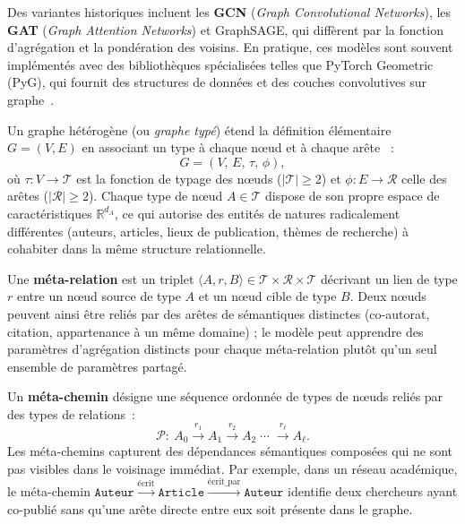 Des variantes historiques incluent les \textbf{GCN} (\emph{Graph Convolutional Networks}), les \textbf{GAT} (\emph{Graph Attention Networks}) et GraphSAGE, qui diff\`erent par la fonction d'agr\'egation et la pond\'eration des voisins.
En pratique, ces mod\`eles sont souvent impl\'ement\'es avec des biblioth\`eques sp\'ecialis\'ees telles que PyTorch Geometric (PyG), qui fournit des structures de donn\'ees et des couches convolutives sur graphe~\cite{fey2019pyg}.


\label{sec:graphes-heterogenes}

Un graphe h\'et\'erog\`ene (ou \emph{graphe typ\'e}) \'etend la d\'efinition \'el\'ementaire $G=(V,E)$ en associant un type \`a chaque n\oe ud et \`a chaque ar\^ete~\cite{hu2020hgt} :
\[
G = (V,\, E,\, \tau,\, \phi),
\]
o\`u $\tau : V \to \mathcal{T}$ est la fonction de typage des n\oe uds ($|\mathcal{T}| \geq 2$) et $\phi : E \to \mathcal{R}$ celle des ar\^etes ($|\mathcal{R}| \geq 2$).
Chaque type de n\oe ud $A \in \mathcal{T}$ dispose de son propre espace de caract\'eristiques $\mathbb{R}^{d_A}$, ce qui autorise des entit\'es de natures radicalement diff\'erentes (auteurs, articles, lieux de publication, th\`emes de recherche) \`a cohabiter dans la m\^eme structure relationnelle.

Une \textbf{m\'eta-relation} est un triplet $\langle A, r, B \rangle \in \mathcal{T} \times \mathcal{R} \times \mathcal{T}$ d\'ecrivant un lien de type $r$ entre un n\oe ud source de type $A$ et un n\oe ud cible de type $B$.
Deux n\oe uds peuvent ainsi \^etre reli\'es par des ar\^etes de s\'emantiques distinctes (co-autorat, citation, appartenance \`a un m\^eme domaine) ; le mod\`ele peut apprendre des param\`etres d'agr\'egation distincts pour chaque m\'eta-relation plut\^ot qu'un seul ensemble de param\`etres partag\'e.

Un \textbf{m\'eta-chemin} d\'esigne une s\'equence ordonn\'ee de types de n\oe uds reli\'es par des types de relations~:
\[
\mathcal{P} :\ A_0 \xrightarrow{r_1} A_1 \xrightarrow{r_2} A_2 \;\cdots\; \xrightarrow{r_\ell} A_\ell.
\]
Les m\'eta-chemins capturent des d\'ependances s\'emantiques compos\'ees qui ne sont pas visibles dans le voisinage imm\'ediat.
Par exemple, dans un r\'eseau acad\'emique, le m\'eta-chemin $\texttt{Auteur} \xrightarrow{\text{\'ecrit}} \texttt{Article} \xrightarrow{\text{\'ecrit\_par}} \texttt{Auteur}$ identifie deux chercheurs ayant co-publi\'e sans qu'une ar\^ete directe entre eux soit pr\'esente dans le graphe.

